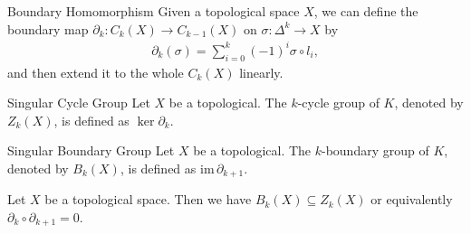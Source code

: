 \documentclass{report}
\begin{document}
\begin{definition}{Boundary Homomorphism}{}
	Given a topological space $X$, we can define the boundary map $\partial_k:C_k(X)\rightarrow C_{k-1}(X)$ on $\sigma:\Delta^k\to X$ by
	\begin{align*}
		\partial_k\left(\sigma\right)=\sum_{i=0}^k(-1)^{i}\sigma\circ l_i,
	\end{align*}
	and then extend it to the whole $C_k(X)$ linearly.
\end{definition}


\begin{definition}{Singular Cycle Group}{}
	Let $X$ be a topological. The $k$-cycle group of $K$, denoted by $Z_k(X)$,  is defined as $\ker\partial_k$.
\end{definition}


\begin{definition}{Singular Boundary Group}{}
	Let $X$ be a topological. The $k$-boundary group of $K$, denoted by $B_k(X)$, is defined as $\mathrm{im}\,\partial_{k+1}$.
\end{definition}


\begin{proposition}{}{}
	Let $X$ be a topological space. Then we have $B_k(X)\subseteq Z_k(X)$ or equivalently $\partial_k\circ\partial_{k+1}=0$.
\end{proposition}
\end{document}

